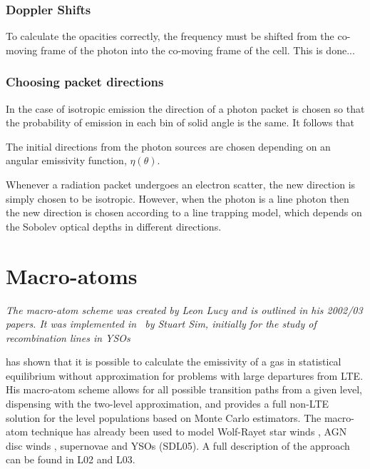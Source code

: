 \subsubsection{Doppler Shifts}

To calculate the opacities correctly, the frequency must be shifted from
the co-moving frame of the photon into the co-moving frame of the cell.
This is done...




\subsubsection{Choosing packet directions}

In the case of isotropic emission the direction of a photon packet
is chosen so that the probability of emission in each bin of solid
angle is the same. It follows that 

The initial directions from the photon sources are chosen
depending on an angular emissivity function, $\eta(\theta)$.


Whenever a radiation packet undergoes an electron scatter,
the new direction is simply chosen to be isotropic. However,
when the photon is a line photon then the new direction is chosen
according to a line trapping model, which depends on the Sobolev
optical depths in different directions. 






\section{Macro-atoms}

{\sl The macro-atom scheme was created by Leon Lucy and is outlined in 
his 2002/03 papers. It was implemented in \py\ by Stuart Sim, initially
for the study of recombination lines in YSOs \citep{simmacro2005}
}

\cite{lucy2002, lucy2003}
has shown that it is possible to calculate the emissivity of a gas in
statistical equilibrium without approximation for problems with large departures
from LTE.
His macro-atom scheme allows for all possible transition paths from a given level,
dispensing with the two-level approximation, and
provides a full non-LTE solution
for the level populations based on Monte Carlo estimators. The macro-atom
technique has already been used to model Wolf-Rayet star
winds \citep{sim2004}, AGN disc winds \citep{simlong2008, tatum2012},
supernovae \citep{kromersim2009, kerzendorfsim} and YSOs (SDL05). A full 
description of the approach can be found in L02 and L03. 

